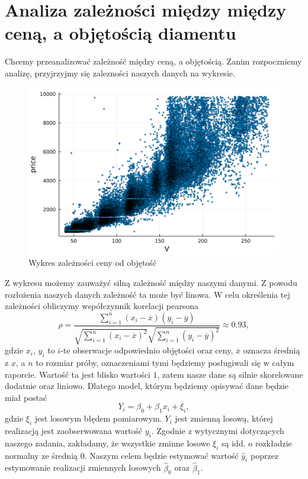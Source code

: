 \documentclass[12pt,leqno]{article}
\theoremstyle{exer}
\begin{document}
	\section{Analiza zależności między między ceną, a objętością diamentu}
	Chcemy przeanalizować zależność między ceną, a objętością. Zanim rozpoczniemy analizę, przyjrzyjmy się zalezności naszych danych na wykresie.
	\begin{figure}[H]\label{fig:v_vs_price}\centering
		\includegraphics[width=4\columnwidth/5]{images/Budnik/v_vs_price.png}\caption{Wykres zależności ceny od objętość}
	\end{figure}
	Z wykresu możemy zauważyć silną zależność między naszymi danymi. Z powodu rozłożenia naszych danych zależność ta może być linowa. W celu określenia tej zależności obliczymy współczynnik korelacji pearsona
	\begin{equation}
		\rho=\frac{\sum_{i=1}^n\left(x_i-\overline{x}\right)\left(y_i-\overline{y}\right)}
		{\sqrt{\sum_{i=1}^n\left(x_i-\overline{x}\right)^2}\sqrt{\sum_{i=1}^n\left(y_i-\overline{y}\right)^2}}\approx0.93,
	\end{equation}
	gdzie $x_i$, $y_i$ to $i$-te obserwacje odpowiednio objętości oraz ceny, $\overline{x}$ oznacza średnią z $x$, a $n$ to rozmiar próby, oznaczeniami tymi będziemy posługiwali się w całym raporcie. Wartość ta jest blisko wartości $1$, zatem nasze dane są silnie skorelowane dodatnie oraz liniowo. Dlatego model, którym będziemy opisywać dane będzie miał postać
	\begin{equation}\label{eq:reg}
		Y_i=\beta_0+\beta_1x_i+\xi_i,
	\end{equation}
	gdzie $\xi_i$ jest losowym błędem pomiarowym. $Y_i$ jest zmienną losową, której realizacją jest zaobserwowana wartość $y_i$. Zgodnie z wytycznymi dotyczących naszego zadania, zakładamy, że wszystkie zminne losowe $\xi_i$ są idd. o rozkładzie normalny ze średnią 0. Naszym celem będzie estymować wartość $\hat y_i$ poprzez estymowanie realizacji zmiennych losowych $\hat \beta_0$ oraz $\hat\beta_1$.
\end{document}
